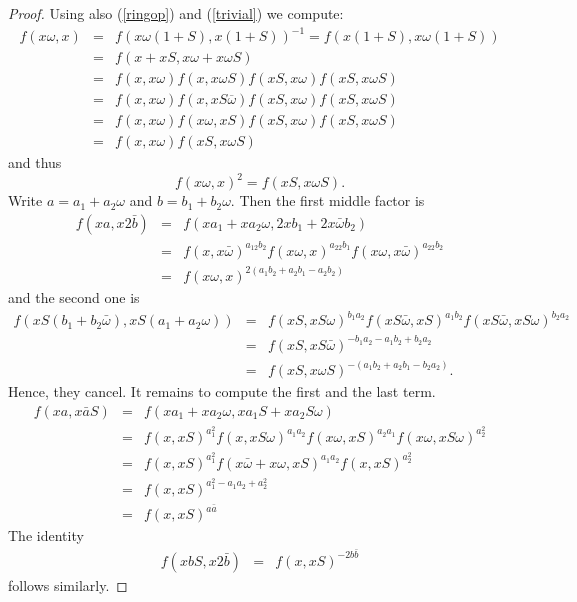 \documentclass{amsart}
\numberwithin{equation}{section}
\theoremstyle{definition}  %
\newtheorem{set theory}[thm]{Set Theoretic Prelude}
\begin{document}
\begin{proof}
 Using also (\ref{ringop}) and (\ref{trivial}) we compute:
\begin{eqnarray*}
f(x{\omega},x) 
&=&f(x{\omega}(1+S),x(1+S))^{-1} = f(x(1+S),x\omega (1+S))\\
&=&f(x+xS,x{\omega}+x{\omega S})\\
&=&f(x,x{\omega})f(x,x{\omega S})f(xS,x{\omega})f(xS,x{\omega S})\\
&=& f(x,x{\omega})f(x,xS\overline{\omega})f(xS,x{\omega})f(xS,x{\omega S})\\
&=& f(x,x{\omega})f(x\omega,xS)f(xS,x{\omega})f(xS,x{\omega S})\\
&=& f(x,x{\omega})f(xS,x{\omega S})
\end{eqnarray*}
and thus
$$ f(x{\omega},x)^2=f(x{S},x{\omega S}).$$
Write $a=a_1+a_2\omega$ and $b=b_1+b_2 \omega$. Then the first middle factor is
\begin{eqnarray*}
f(xa,x2\bar{b})&=& f(xa_1+xa_2\omega,2xb_1+2x\bar{\omega}b_2)\\
&=& f(x,x\bar{\omega})^{a_12b_2}f(x\omega,x)^{a_22b_1}f(x\omega,x\bar{\omega})^{a_22b_2}\\&=&f(x\omega,x)^{2(a_1b_2+a_2b_1-a_2b_2)}
\end{eqnarray*}
and the second one is
\begin{eqnarray*}
f(xS(b_1+b_2\bar{\omega}),xS(a_1+a_2\omega))&=&f(xS,xS\omega)^{b_1a_2}f(xS\bar{\omega},xS)^{a_1b_2}f(xS\bar{\omega},xS\omega)^{b_2a_2}\\
&=&f(xS,xS\bar{\omega})^{-b_1a_2-a_1b_2+b_2a_2}\\
&=&f(xS,x\omega S)^{-(a_1b_2+a_2b_1-b_2a_2)}.
\end{eqnarray*}
Hence, they cancel. It remains to compute the first and the last term.
\begin{eqnarray*}
f(xa,x\bar{a}S)&=&f(xa_1+xa_2\omega, xa_1S+xa_2S\omega)\\
&=&f(x,xS)^{a_1^2}f(x,xS\omega)^{a_1a_2}f(x\omega, xS)^{a_2a_1}f(x\omega,xS\omega)^{a_2^2}\\
&=&f(x,xS)^{a_1^2}f(x \bar{\omega}+x\omega, xS)^{a_1a_2}f(x,xS)^{a_2^2}\\
&=& f(x,xS)^{a_1^2-a_1a_2+a_2^2}\\
&=& f(x,xS)^{a\bar{a}}
\end{eqnarray*}
The identity
\begin{eqnarray*}
f(x{bS},x{2\bar{b}})&=& f(x,xS)^{-2b\bar{b}}
\end{eqnarray*}
follows similarly. 
\end{proof}
\end{document}
